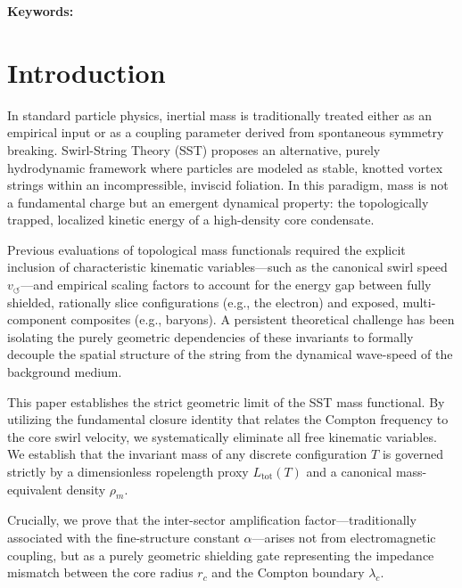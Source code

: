 \documentclass[11pt, a4paper]{article}
\begin{document}
    
    
  


        
        \vspace{1em}
        \noindent \textbf{Keywords:}
        
        \section{Introduction}
            
            In standard particle physics, inertial mass is traditionally treated either as an empirical input or as a coupling parameter derived from spontaneous symmetry breaking. Swirl-String Theory (SST) proposes an alternative, purely hydrodynamic framework where particles are modeled as stable, knotted vortex strings within an incompressible, inviscid foliation. In this paradigm, mass is not a fundamental charge but an emergent dynamical property: the topologically trapped, localized kinetic energy of a high-density core condensate.
            
            Previous evaluations of topological mass functionals required the explicit inclusion of characteristic kinematic variables---such as the canonical swirl speed $v_{\circlearrowleft}$---and empirical scaling factors to account for the energy gap between fully shielded, rationally slice configurations (e.g., the electron) and exposed, multi-component composites (e.g., baryons). A persistent theoretical challenge has been isolating the purely geometric dependencies of these invariants to formally decouple the spatial structure of the string from the dynamical wave-speed of the background medium.
            
            This paper establishes the strict geometric limit of the SST mass functional. By utilizing the fundamental closure identity that relates the Compton frequency to the core swirl velocity, we systematically eliminate all free kinematic variables. We establish that the invariant mass of any discrete configuration $T$ is governed strictly by a dimensionless ropelength proxy $L_{\mathrm{tot}}(T)$ and a canonical mass-equivalent density $\rho_m$.
            
            Crucially, we prove that the inter-sector amplification factor---traditionally associated with the fine-structure constant $\alpha$---arises not from electromagnetic coupling, but as a purely geometric shielding gate representing the impedance mismatch between the core radius $r_c$ and the Compton boundary $\lambda_c$.
            
\end{document}
